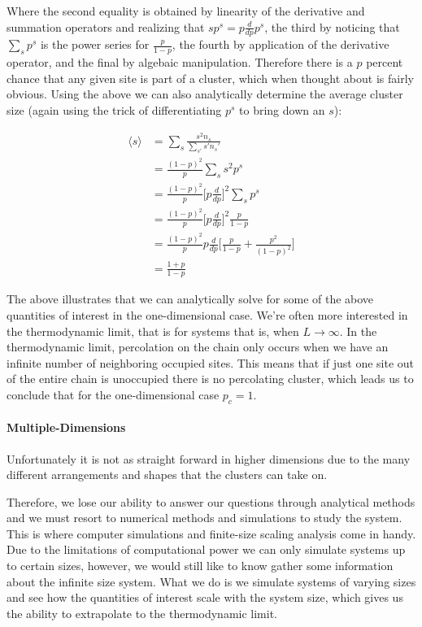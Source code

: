 Where the second equality is obtained by linearity of the derivative and summation operators and realizing that $s p^s = p \frac{d}{dp} p^s$, the third by noticing that $\sum_s p^s$ is the power series for $\frac{p}{1-p}$, the fourth by application of the derivative operator, and the final by algebaic manipulation.
Therefore there is a $p$ percent chance that any given site is part of a cluster, which when thought about is fairly obvious.
Using the above we can also analytically determine the average cluster size (again using the trick of differentiating $p^s$ to bring down an $s$):

\begin{equation}
\begin{split}
	\langle s \rangle &= \sum_s \frac{s^2 n_s}{\sum_{s'} s' n_s'}\\
	&= \frac{(1 - p)^2}{p} \sum_s s^2 p^s\\
	&= \frac{(1 - p)^2}{p} \bigg[p\frac{d}{dp}\bigg]^2 \sum_s p^s\\
	&= \frac{(1 - p)^2}{p} \bigg[p\frac{d}{dp}\bigg]^2 \frac{p}{1 - p}\\
	&= \frac{(1 - p)^2}{p} p \frac{d}{dp} \bigg[ \frac{p}{1-p} + \frac{p^2}{(1 - p)^2} \bigg]\\
	&= \frac{1 + p}{1 - p}
\end{split}
\end{equation}

The above illustrates that we can analytically solve for some of the above quantities of interest in the one-dimensional case.
We're often more interested in the thermodynamic limit, that is for systems that is, when $L \rightarrow \infty$.
In the thermodynamic limit, percolation on the chain only occurs when we have an infinite number of neighboring occupied sites.
This means that if just one site out of the entire chain is unoccupied there is no percolating cluster, which leads us to conclude that for the one-dimensional case $p_c = 1$.

\paragraph{Multiple-Dimensions}
Unfortunately it is not as straight forward in higher dimensions due to the many different arrangements and shapes that the clusters can take on.


Therefore, we lose our ability to answer our questions through analytical methods and we must resort to numerical methods and simulations to study the system.
This is where computer simulations and finite-size scaling analysis come in handy.
Due to the limitations of computational power we can only simulate systems up to certain sizes, however, we would still like to know gather some information about the infinite size system.
What we do is we simulate systems of varying sizes and see how the quantities of interest scale with the system size, which gives us the ability to extrapolate to the thermodynamic limit.

